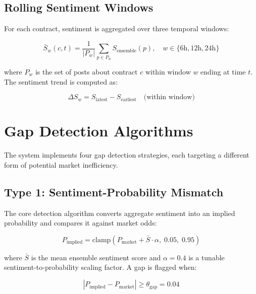 \documentclass[12pt, letterpaper]{article}
\begin{document}
\subsection{Rolling Sentiment Windows}

For each contract, sentiment is aggregated over three temporal windows:

\begin{equation}
    \bar{S}_{w}(c, t) = \frac{1}{|P_{w}|} \sum_{p \in P_{w}} S_{\text{ensemble}}(p), \quad w \in \{6\text{h}, 12\text{h}, 24\text{h}\}
\end{equation}

where $P_{w}$ is the set of posts about contract $c$ within window $w$ ending at time $t$. The sentiment trend is computed as:

\begin{equation}
    \Delta S_{w} = S_{\text{latest}} - S_{\text{earliest}} \quad \text{(within window)}
\end{equation}

\section{Gap Detection Algorithms}
\label{sec:gap_detection}

The system implements four gap detection strategies, each targeting a different form of potential market inefficiency.

\subsection{Type 1: Sentiment-Probability Mismatch}

The core detection algorithm converts aggregate sentiment into an implied probability and compares it against market odds:

\begin{equation}
    P_{\text{implied}} = \text{clamp}\left(P_{\text{market}} + \bar{S} \cdot \alpha, \; 0.05, \; 0.95\right)
    \label{eq:implied_prob}
\end{equation}

where $\bar{S}$ is the mean ensemble sentiment score and $\alpha = 0.4$ is a tunable sentiment-to-probability scaling factor. A gap is flagged when:

\begin{equation}
    |P_{\text{implied}} - P_{\text{market}}| \geq \theta_{\text{gap}} = 0.04
\end{equation}
\end{document}
